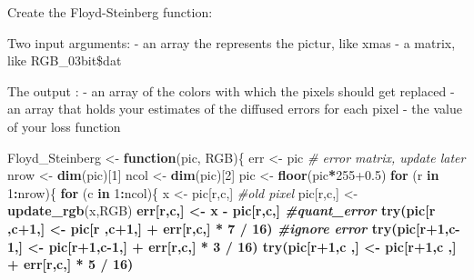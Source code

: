 \documentclass[]{article}
\newenvironment{Shaded}{\begin{snugshade}}{\end{snugshade}}
\newcommand{\CommentTok}[1]{\textcolor[rgb]{0.56,0.35,0.01}{\textit{#1}}}
\newcommand{\ControlFlowTok}[1]{\textcolor[rgb]{0.13,0.29,0.53}{\textbf{#1}}}
\newcommand{\DecValTok}[1]{\textcolor[rgb]{0.00,0.00,0.81}{#1}}
\newcommand{\FloatTok}[1]{\textcolor[rgb]{0.00,0.00,0.81}{#1}}
\newcommand{\KeywordTok}[1]{\textcolor[rgb]{0.13,0.29,0.53}{\textbf{#1}}}
\newcommand{\NormalTok}[1]{#1}
\newcommand{\OperatorTok}[1]{\textcolor[rgb]{0.81,0.36,0.00}{\textbf{#1}}}
\newcommand{\StringTok}[1]{\textcolor[rgb]{0.31,0.60,0.02}{#1}}
\begin{document}
Create the Floyd-Steinberg function:

Two input arguments: - an array the represents the pictur, like xmas - a
matrix, like RGB\_03bit\$dat

The output : - an array of the colors with which the pixels should get
replaced - an array that holds your estimates of the diffused errors for
each pixel - the value of your loss function

\begin{Shaded}
\begin{Highlighting}[]
\NormalTok{Floyd_Steinberg <-}\StringTok{ }\ControlFlowTok{function}\NormalTok{(pic, RGB)\{}
\NormalTok{  err <-}\StringTok{ }\NormalTok{pic }\CommentTok{# error matrix, update later}
\NormalTok{  nrow <-}\StringTok{ }\KeywordTok{dim}\NormalTok{(pic)[}\DecValTok{1}\NormalTok{]}
\NormalTok{  ncol <-}\StringTok{ }\KeywordTok{dim}\NormalTok{(pic)[}\DecValTok{2}\NormalTok{]}
\NormalTok{  pic <-}\StringTok{ }\KeywordTok{floor}\NormalTok{(pic}\OperatorTok{*}\DecValTok{255}\FloatTok{+0.5}\NormalTok{)}
  \ControlFlowTok{for}\NormalTok{ (r }\ControlFlowTok{in} \DecValTok{1}\OperatorTok{:}\NormalTok{nrow)\{}
     \ControlFlowTok{for}\NormalTok{ (c }\ControlFlowTok{in} \DecValTok{1}\OperatorTok{:}\NormalTok{ncol)\{}
\NormalTok{       x <-}\StringTok{ }\NormalTok{pic[r,c,]   }\CommentTok{#old pixel}
\NormalTok{       pic[r,c,] <-}\StringTok{ }\KeywordTok{update_rgb}\NormalTok{(x,RGB) }\OperatorTok{%
\NormalTok{       err[r,c,] <-}\StringTok{ }\NormalTok{x }\OperatorTok{-}\StringTok{ }\NormalTok{pic[r,c,] }\CommentTok{#quant_error}
       \KeywordTok{try}\NormalTok{(pic[r  ,c}\OperatorTok{+}\DecValTok{1}\NormalTok{,] <-}\StringTok{ }\NormalTok{pic[r  ,c}\OperatorTok{+}\DecValTok{1}\NormalTok{,] }\OperatorTok{+}\StringTok{ }\NormalTok{err[r,c,] }\OperatorTok{*}\StringTok{ }\DecValTok{7} \OperatorTok{/}\StringTok{ }\DecValTok{16}\NormalTok{) }\CommentTok{#ignore error}
       \KeywordTok{try}\NormalTok{(pic[r}\OperatorTok{+}\DecValTok{1}\NormalTok{,c}\DecValTok{-1}\NormalTok{,] <-}\StringTok{ }\NormalTok{pic[r}\OperatorTok{+}\DecValTok{1}\NormalTok{,c}\DecValTok{-1}\NormalTok{,] }\OperatorTok{+}\StringTok{ }\NormalTok{err[r,c,] }\OperatorTok{*}\StringTok{ }\DecValTok{3} \OperatorTok{/}\StringTok{ }\DecValTok{16}\NormalTok{)}
       \KeywordTok{try}\NormalTok{(pic[r}\OperatorTok{+}\DecValTok{1}\NormalTok{,c  ,] <-}\StringTok{ }\NormalTok{pic[r}\OperatorTok{+}\DecValTok{1}\NormalTok{,c  ,] }\OperatorTok{+}\StringTok{ }\NormalTok{err[r,c,] }\OperatorTok{*}\StringTok{ }\DecValTok{5} \OperatorTok{/}\StringTok{ }\DecValTok{16}\NormalTok{)}
}
\end{Highlighting}
\end{Shaded}
\end{document}
